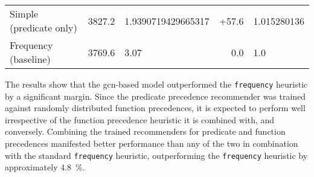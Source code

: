 \begin{table*}[h]
\begin{tabular}{l|ll|rl}
Simple (predicate only) &
\num{3827.2} &
\num[round-mode=places,round-precision=2]{1.9390719429665317} &
+57.6 &
\num[round-mode=places,round-precision=3]{1.015280136} \\




Frequency (baseline) &
\num{3769.6} &
\num{3.07} &
0.0 &
\num[round-mode=places,round-precision=3]{1.0} \\

\end{tabular}
\end{table*}


The results show that the \gls{gcn}-based model outperformed the \texttt{frequency} heuristic by a significant margin.
Since the predicate precedence recommender was trained against randomly distributed function precedences,
it is expected to perform well irrespective of the function precedence heuristic it is combined with, and conversely.
Combining the trained recommenders for predicate and function precedences manifested better performance
than any of the two in combination with the standard \texttt{frequency} heuristic,
outperforming the \texttt{frequency} heuristic by approximately \SI{4.8}{\percent}.


